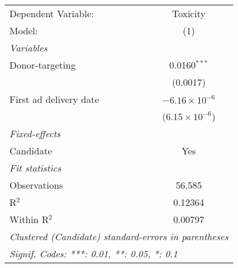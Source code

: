 
\begingroup
\centering
\begin{tabular}{lc}
   \tabularnewline \midrule \midrule
   Dependent Variable:    & Toxicity\\  
   Model:                 & (1)\\  
   \midrule
   \emph{Variables}\\
   Donor-targeting        & 0.0160$^{***}$\\   
                          & (0.0017)\\   
   First ad delivery date & $-6.16\times 10^{-6}$\\    
                          & ($6.15\times 10^{-6}$)\\    
   \midrule
   \emph{Fixed-effects}\\
   Candidate              & Yes\\  
   \midrule
   \emph{Fit statistics}\\
   Observations           & 56,585\\  
   R$^2$                  & 0.12364\\  
   Within R$^2$           & 0.00797\\  
   \midrule \midrule
   \multicolumn{2}{l}{\emph{Clustered (Candidate) standard-errors in parentheses}}\\
   \multicolumn{2}{l}{\emph{Signif. Codes: ***: 0.01, **: 0.05, *: 0.1}}\\
\end{tabular}
\par\endgroup



